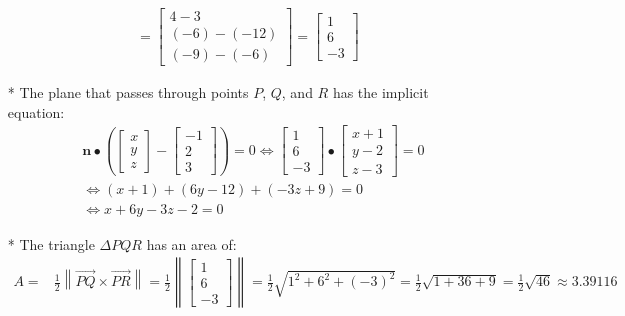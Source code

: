 \documentclass{article}
\begin{document}
\begin{itemize}
\begin{align*}
= \begin{bmatrix} 4 - 3 \\ (-6) - (-12) \\ (-9) - (-6) \end{bmatrix} 
= \begin{bmatrix} 1 \\ 6 \\ -3 \end{bmatrix}  
\end{align*}   
\item[*] The plane that passes through points \(P\), \(Q\), and \(R\) has the implicit equation:
\begin{align*}
& \mathbf{n} \bullet \left(\begin{bmatrix} x \\ y \\ z \end{bmatrix} - \begin{bmatrix} -1 \\ 2 \\ 3 \end{bmatrix}\right) = 0 
\iff \begin{bmatrix} 1 \\ 6 \\ -3 \end{bmatrix} \bullet \begin{bmatrix} x + 1 \\ y - 2 \\ z - 3 \end{bmatrix} = 0 \\
& \iff (x + 1) + (6y - 12) + (-3z + 9) = 0 \\ 
& \iff x + 6y - 3z - 2 = 0
\end{align*}
\item[*] The triangle \(\Delta PQR\) has an area of:   
\begin{align*}
A = & \frac{1}{2}\left\|\overrightarrow{PQ} \times \overrightarrow{PR}\right\|  
= \frac{1}{2}\left\|\begin{bmatrix} 1 \\ 6 \\ -3 \end{bmatrix}\right\| 
= \frac{1}{2}\sqrt{1^2 + 6^2 + (-3)^2} 
= \frac{1}{2}\sqrt{1 + 36 + 9} = \frac{1}{2}\sqrt{46} \approx 3.39116
\end{align*}
\end{itemize}




\end{document}
